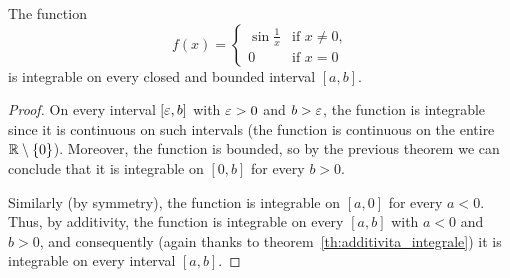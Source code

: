 \begin{example}
The function
\[
  f(x) = \begin{cases}
  \sin\frac 1 x & \text{if $x\neq 0$,}\\
  0 & \text{if $x=0$}
  \end{cases}
\]
is integrable on every closed and bounded interval $[a,b]$.
\end{example}
\begin{proof}
On every interval $[\varepsilon,b]$ with $\varepsilon>0$ and $b>\varepsilon$, the function
is integrable since it is continuous on such intervals (the function is
continuous on
the entire ${\mathbb R}\setminus{\left\{ 0 \right\}}$). Moreover, the function is bounded, so by
the previous theorem
we can conclude that it is integrable on $[0,b]$ for every $b>0$.

Similarly (by symmetry), the function is integrable on $[a,0]$
for every $a<0$.
Thus, by additivity, the function is integrable on every $[a,b]$ with $a<0$ and
$b>0$,
and consequently (again thanks to theorem~\ref{th:additivita_integrale})
it is integrable on every interval $[a,b]$.
\end{proof}